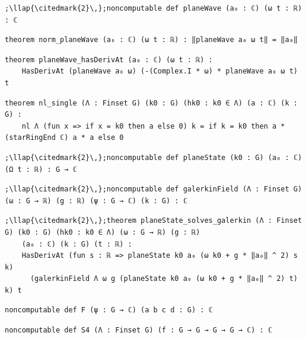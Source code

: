 \begin{lstlisting}[style=leancat]
;\llap{\citedmark{2}\,};noncomputable def planeWave (a₀ : ℂ) (ω t : ℝ) : ℂ
\end{lstlisting}

\begin{lstlisting}[style=leancat]
theorem norm_planeWave (a₀ : ℂ) (ω t : ℝ) : ‖planeWave a₀ ω t‖ = ‖a₀‖
\end{lstlisting}

\begin{lstlisting}[style=leancat]
theorem planeWave_hasDerivAt (a₀ : ℂ) (ω t : ℝ) :
    HasDerivAt (planeWave a₀ ω) (-(Complex.I * ω) * planeWave a₀ ω t) t
\end{lstlisting}

\begin{lstlisting}[style=leancat]
theorem nl_single (Λ : Finset G) (k0 : G) (hk0 : k0 ∈ Λ) (a : ℂ) (k : G) :
    nl Λ (fun x => if x = k0 then a else 0) k = if k = k0 then a * (starRingEnd ℂ) a * a else 0
\end{lstlisting}

\begin{lstlisting}[style=leancat]
;\llap{\citedmark{2}\,};noncomputable def planeState (k0 : G) (a₀ : ℂ) (Ω t : ℝ) : G → ℂ
\end{lstlisting}

\begin{lstlisting}[style=leancat]
;\llap{\citedmark{2}\,};noncomputable def galerkinField (Λ : Finset G) (ω : G → ℝ) (g : ℝ) (ψ : G → ℂ) (k : G) : ℂ
\end{lstlisting}

\begin{lstlisting}[style=leancat]
;\llap{\citedmark{2}\,};theorem planeState_solves_galerkin (Λ : Finset G) (k0 : G) (hk0 : k0 ∈ Λ) (ω : G → ℝ) (g : ℝ)
    (a₀ : ℂ) (k : G) (t : ℝ) :
    HasDerivAt (fun s : ℝ => planeState k0 a₀ (ω k0 + g * ‖a₀‖ ^ 2) s k)
      (galerkinField Λ ω g (planeState k0 a₀ (ω k0 + g * ‖a₀‖ ^ 2) t) k) t
\end{lstlisting}

\begin{lstlisting}[style=leancat]
noncomputable def F (ψ : G → ℂ) (a b c d : G) : ℂ
\end{lstlisting}

\begin{lstlisting}[style=leancat]
noncomputable def S4 (Λ : Finset G) (f : G → G → G → G → ℂ) : ℂ
\end{lstlisting}

